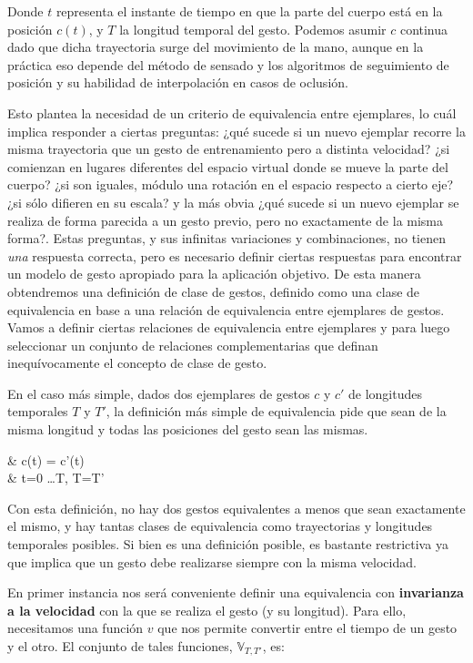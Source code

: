 Donde $t$ representa el instante de tiempo en que la parte del cuerpo está en la posición $c(t)$, y $T$ la longitud temporal del gesto. Podemos asumir $c$ continua dado que dicha trayectoria surge del movimiento de la mano, aunque en la práctica eso depende del método de sensado y los algoritmos de seguimiento de posición y su habilidad de interpolación en casos de oclusión. 

Esto plantea la necesidad de un criterio de equivalencia entre ejemplares, lo cuál implica responder a ciertas preguntas: ¿qué sucede si un nuevo ejemplar recorre la misma trayectoria que un gesto de entrenamiento pero a distinta velocidad? ¿si comienzan en lugares diferentes del espacio virtual donde se mueve la parte del cuerpo? ¿si son iguales, módulo una rotación en el espacio respecto a cierto eje? ¿si sólo difieren en su escala? y la más obvia ¿qué sucede si un nuevo ejemplar se realiza de forma parecida a un gesto previo, pero no exactamente de la misma forma?. Estas preguntas, y sus infinitas variaciones y combinaciones, no tienen \textit{una} respuesta correcta, pero es necesario definir ciertas respuestas para encontrar un modelo de gesto apropiado para la aplicación objetivo. De esta manera obtendremos una definición de clase de gestos, definido como una clase de equivalencia en base a una relación de equivalencia entre ejemplares de gestos. Vamos a definir ciertas relaciones de equivalencia entre ejemplares y para luego seleccionar un conjunto de relaciones complementarias que definan inequívocamente el concepto de clase de gesto.

En el caso más simple, dados dos ejemplares de gestos $c$ y $c'$ de longitudes temporales $T$ y $T'$, la definición más simple de equivalencia pide que sean de la misma longitud y todas las posiciones del gesto sean las mismas.
  

{ & c(t) = c'(t) 
\\ & t=0 \dots T, \; T=T'}   

Con esta definición, no hay dos gestos equivalentes a menos que sean exactamente el mismo, y hay tantas clases de equivalencia como trayectorias y longitudes temporales posibles. Si bien es una definición posible, es bastante restrictiva ya que implica que un gesto debe realizarse siempre con la misma velocidad.


\newcommand{\vset}{\mathbb{V}_{T,T'}}

En primer instancia nos será conveniente definir una equivalencia con \textbf{invarianza a la velocidad} con la que se realiza el gesto (y su longitud). Para ello, necesitamos una función $v$ que nos permite convertir entre el tiempo de un gesto y el otro. El conjunto de tales funciones, $\vset$, es:


